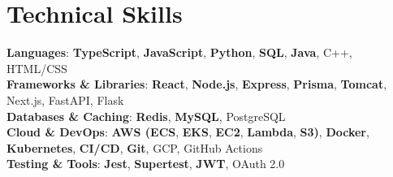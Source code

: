 \documentclass[letterpaper,11pt]{article}
\begin{document}
\section*{Technical Skills}
\begingroup
\small
\textbf{Languages}: \textbf{TypeScript}, \textbf{JavaScript}, \textbf{Python}, \textbf{SQL}, \textbf{Java}, C++, HTML/CSS \\
\textbf{Frameworks \& Libraries}: \textbf{React}, \textbf{Node.js}, \textbf{Express}, \textbf{Prisma}, \textbf{Tomcat}, Next.js, FastAPI, Flask \\
\textbf{Databases \& Caching}: \textbf{Redis}, \textbf{MySQL}, PostgreSQL \\
\textbf{Cloud \& DevOps}: \textbf{AWS (ECS}, \textbf{EKS}, \textbf{EC2}, \textbf{Lambda}, \textbf{S3)}, \textbf{Docker}, \textbf{Kubernetes}, \textbf{CI/CD}, \textbf{Git}, GCP, GitHub Actions \\
\textbf{Testing \& Tools}: \textbf{Jest}, \textbf{Supertest}, \textbf{JWT}, OAuth 2.0 \\
\endgroup
\end{document}
